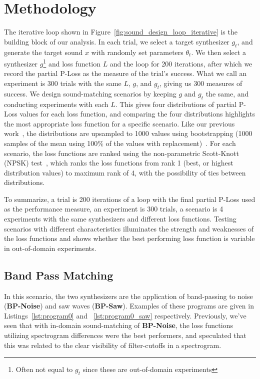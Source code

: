 \documentclass[runningheads]{llncs}
\providecommand{\gls}[1]{#1}
\newcommand{\BPNoise}{\textbf{BP-Noise}\xspace}
\newcommand{\BPSaw}{\textbf{BP-Saw}\xspace}
\begin{document}
\section{Methodology}
\label{sec:experiment_setup}
The iterative loop shown in Figure~\ref{fig:sound_design_loop_iterative} is the building block of our analysis. In each trial, we select a target synthesizer $g_t$, and generate the target sound $x$ with randomly set parameters $\theta_t$. We then select a synthesizer $g$\footnote{Often not equal to $g_t$ since these are out-of-domain experiments} and loss function $L$ and the loop for 200 iterations, after which we record the partial P-Loss as the measure of the trial's success. What we call an experiment is 300 trials with the same $L$, $g$, and $g_t$, giving us 300 measures of success. We design sound-matching scenarios by keeping $g$ and $g_t$ the same, and conducting experiments with each $L$. This gives four distributions of partial P-Loss values for each loss function, and comparing the four distributions highlights the most appropriate loss function for a specific scenario. Like our previous work~\cite{salimi2025soundmatching}, the distributions are upsampled to 1000 values using bootstrapping (1000 samples of the mean using 100\% of the values with replacement)~\cite{tibshirani1993introduction,chernick2011bootstrap}. For each scenario, the loss functions are ranked using the non-parametric Scott-Knott (\gls{NPSK}) test~\cite{tantithamthavorn2017mvt,tantithamthavorn2018optimization}, which ranks the loss functions from rank 1 (best, or highest distribution values) to maximum rank of 4, with the possibility of ties between distributions. 

To summarize, a trial is 200 iterations of a loop with the final partial P-Loss used as the performance measure, an experiment is 300 trials, a scenario is 4 experiments with the same synthesizers and different loss functions. Testing scenarios with different characteristics illuminates the strength and weaknesses of the loss functions and shows whether the best performing loss function is variable in out-of-domain experiments.


\subsection{Band Pass Matching}
In this scenario, the two synthesizers are the application of band-passing to noise (\BPNoise) and saw waves (\BPSaw). Examples of these programs are given in Listings~\ref{lst:program0} and ~\ref{lst:program0_saw} respectively. Previously, we've seen that with in-domain sound-matching of \BPNoise, the loss functions utilizing spectrogram differences were the best performers, and speculated that this was related to the clear visibility of filter-cutoffs in a spectrogram. 
 
\end{document}

